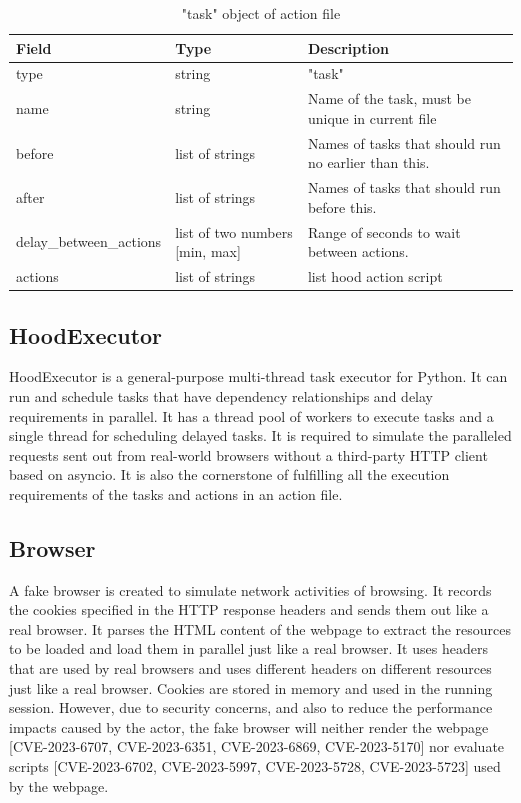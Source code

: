 \documentclass[mscthesis]{usiinfthesis}
\begin{document}
\begin{table}[H]
  \centering
  \begin{tabular}{|p{34mm}|p{26mm}|p{65mm}|}
    \hline
    Field                   & Type                           & Description                                          \\
    \hline
    type                    & string                         & "task"                                               \\
    name                    & string                         & Name of the task, must be unique in current file     \\
    before                  & list of strings                & Names of tasks that should run no earlier than this. \\
    after                   & list of strings                & Names of tasks that should run before this.          \\
    delay\_between\_actions & list of two numbers [min, max] & Range of seconds to wait between actions.            \\
    actions                 & list of strings                & list hood action script                              \\
    \hline
  \end{tabular}
  \caption{"task" object of action file}
  \label{tab:task_object}
\end{table}

\subsection{HoodExecutor}
HoodExecutor is a general-purpose multi-thread task executor for Python. It can run and schedule tasks that have dependency relationships and delay requirements in parallel. It has a thread pool of workers to execute tasks and a single thread for scheduling delayed tasks. It is required to simulate the paralleled requests sent out from real-world browsers without a third-party HTTP client based on asyncio. It is also the cornerstone of fulfilling all the execution requirements of the tasks and actions in an action file.

\subsection{Browser}\label{sec:browser}
A fake browser is created to simulate network activities of browsing. It records the cookies specified in the HTTP response headers and sends them out like a real browser. It parses the HTML content of the webpage to extract the resources to be loaded and load them in parallel just like a real browser. It uses headers that are used by real browsers and uses different headers on different resources just like a real browser. Cookies are stored in memory and used in the running session. However, due to security concerns, and also to reduce the performance impacts caused by the actor, the fake browser will neither render the webpage [CVE-2023-6707, CVE-2023-6351, CVE-2023-6869, CVE-2023-5170] nor evaluate scripts [CVE-2023-6702, CVE-2023-5997, CVE-2023-5728, CVE-2023-5723] used by the webpage.
\end{document}
